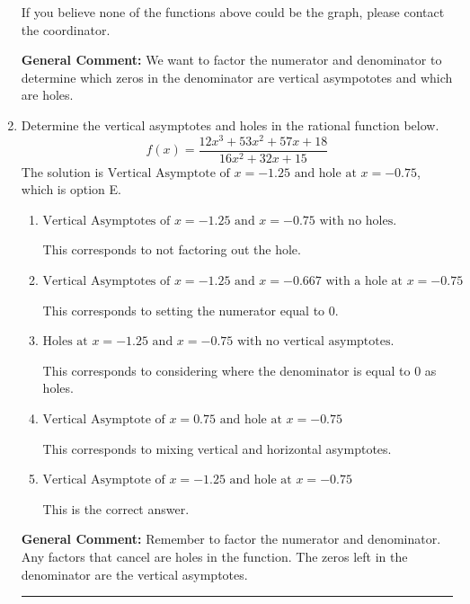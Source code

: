 \documentclass{extbook}[14pt]
\newcommand{\litem}[1]{\item #1

\rule{\textwidth}{0.4pt}}
\begin{document}
\begin{enumerate}
{\begin{enumerate}[label=\Alph*.]
If you believe none of the functions above could be the graph, please contact the coordinator.
\end{enumerate}

\textbf{General Comment:} We want to factor the numerator and denominator to determine which zeros in the denominator are vertical asympototes and which are holes.
}
\litem{
Determine the vertical asymptotes and holes in the rational function below.
\[ f(x) = \frac{12x^{3} +53 x^{2} +57 x + 18}{16x^{2} +32 x + 15} \]The solution is \( \text{Vertical Asymptote of } x = -1.25 \text{ and hole at } x = -0.75 \), which is option E.\begin{enumerate}[label=\Alph*.]
\item \( \text{Vertical Asymptotes of } x = -1.25 \text{ and } x = -0.75 \text{ with no holes.} \)

This corresponds to not factoring out the hole.
\item \( \text{Vertical Asymptotes of } x = -1.25 \text{ and } x = -0.667 \text{ with a hole at } x = -0.75 \)

This corresponds to setting the numerator equal to 0.
\item \( \text{Holes at } x = -1.25 \text{ and } x = -0.75 \text{ with no vertical asymptotes.} \)

This corresponds to considering where the denominator is equal to 0 as holes.
\item \( \text{Vertical Asymptote of } x = 0.75 \text{ and hole at } x = -0.75 \)

This corresponds to mixing vertical and horizontal asymptotes.
\item \( \text{Vertical Asymptote of } x = -1.25 \text{ and hole at } x = -0.75 \)

This is the correct answer.
\end{enumerate}

\textbf{General Comment:} Remember to factor the numerator and denominator. Any factors that cancel are holes in the function. The zeros left in the denominator are the vertical asymptotes.
}
\end{enumerate}
\end{document}
